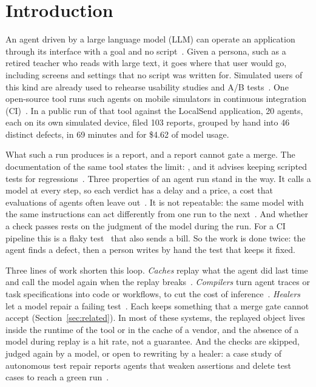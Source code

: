 \section{Introduction}
\label{sec:introduction}

An agent driven by a large language model (LLM) can operate an application through its interface with a goal and no script~\cite{liu2023gptdroid,yoon2024droidagent,wang2024survey}. Given a persona, such as a retired teacher who reads with large text, it goes where that user would go, including screens and settings that no script was written for. Simulated users of this kind are already used to rehearse usability studies and A/B tests~\cite{lu2025uxagent,lu2025agentab}. One open-source tool runs such agents on mobile simulators in continuous integration (CI)~\matcite. In a public run of that tool against the LocalSend application, 20 agents, each on its own simulated device, filed 103 reports, grouped by hand into 46 distinct defects, in 69 minutes and for \$4.62 of model usage.

What such a run produces is a report, and a report cannot gate a merge. The documentation of the same tool states the limit: \matlimit, and it advises keeping scripted tests for regressions~\matcite. Three properties of an agent run stand in the way. It calls a model at every step, so each verdict has a delay and a price, a cost that evaluations of agents often leave out~\cite{kapoor2025agents}. It is not repeatable: the same model with the same instructions can act differently from one run to the next~\cite{ouyang2025nondeterminism,yao2025taubench}. And whether a check passes rests on the judgment of the model during the run. For a CI pipeline this is a flaky test~\cite{luo2014flaky} that also sends a bill. So the work is done twice: the agent finds a defect, then a person writes by hand the test that keeps it fixed.

Three lines of work shorten this loop. \emph{Caches} replay what the agent did last time and call the model again when the replay breaks~\cite{stagehand,midscene,shortest,arbigent,workflowuse,musclemem,skyvern}. \emph{Compilers} turn agent traces or task specifications into code or workflows, to cut the cost of inference~\cite{jaber2026auto,elyadouni2026tracecompiler,chundru2026agentic,trooskens2026compiled}. \emph{Healers} let a model repair a failing test~\cite{playwrightagents,xu2023guiding}. Each keeps something that a merge gate cannot accept (Section~\ref{sec:related}). In most of these systems, the replayed object lives inside the runtime of the tool or in the cache of a vendor, and the absence of a model during replay is a hit rate, not a guarantee. And the checks are skipped, judged again by a model, or open to rewriting by a healer: a case study of autonomous test repair reports agents that weaken assertions and delete test cases to reach a green run~\cite{lee2026limits}.

